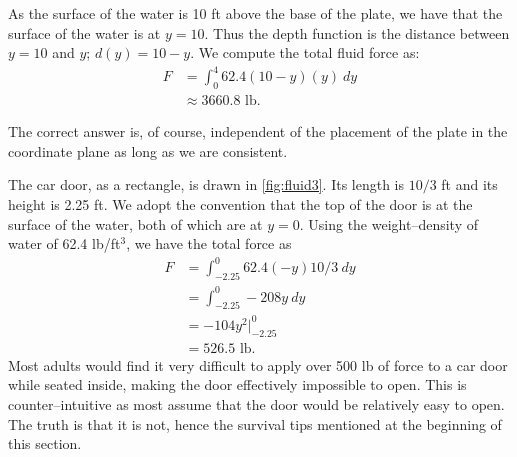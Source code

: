 {\begin{enumerate}
	As the surface of the water is 10 ft above the base of the plate, we have that the surface of the water is at $y=10$. Thus the depth function is the distance between $y=10$ and $y$; $d(y) = 10-y$. We compute the total fluid force as:
	\begin{align*}
	F	&=\int_0^4 62.4(10-y)(y)\ dy \\
		&\approx 3660.8\text{ lb}.
	\end{align*}
\end{enumerate}
The correct answer is, of course, independent of the placement of the plate in the coordinate plane as long as we are consistent.}

{The car door, as a rectangle, is drawn in \autoref{fig:fluid3}. Its length is $10/3$ ft and its height is 2.25 ft. We adopt the convention that the top of the door is at the surface of the water, both of which are at $y=0$. Using the weight--density of water of 62.4 lb/ft$^3$, we have the total force as
\begin{align*}
	F &=	\int_{-2.25}^0 62.4(-y)10/3\ dy \\
	&= 	\int_{-2.25}^0 -208y\ dy\\
	&= -104y^2\Big|_{-2.25}^0 \\
	&=	526.5 \text{ lb.}
\end{align*}
Most adults would find it very difficult to apply over 500 lb of force to a car door while seated inside, making the door effectively impossible to open. This  is  counter--intuitive as most assume that the door would be relatively easy to open. The truth is that it is not, hence the survival tips mentioned at the beginning of this section.}


